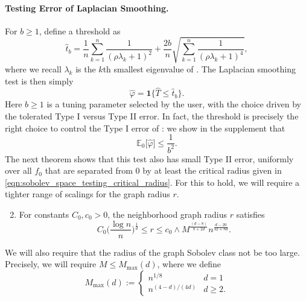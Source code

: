 \documentclass[twoside]{article}
\newcommand{\1}{\mathbf{1}}
\newcommand{\Lap}{L}
\newcommand{\Ebb}{\mathbb{E}}
\newcommand{\wh}[1]{\widehat{#1}}
\theoremstyle{definition}
\theoremstyle{remark}
\begin{document}
\paragraph{Testing Error of Laplacian Smoothing.}

For $b \geq 1$, define a threshold \smash{$\wh{t}_b$} as
\begin{equation*}
\wh{t}_{b} = \frac{1}{n}\sum_{k = 1}^{n} \frac{1}{(\rho \lambda_k + 1)^2} + \frac{2b}{n}\sqrt{\sum_{k = 1}^{n} \frac{1}{(\rho \lambda_k + 1)^4}},
\end{equation*}
where we recall $\lambda_k$ is the $k$th smallest eigenvalue of \smash{$\Lap_{n,r}$}. The Laplacian smoothing test is then simply
\begin{equation*}
\wh{\varphi} = \1\bigl\{\wh{T} \leq \wh{t}_b\bigr\}.
\end{equation*} 
Here $b \geq 1$ is a tuning parameter selected by the user, with the choice driven by the tolerated Type I versus Type II error. In fact, the threshold \smash{$\wh{t}_b$} is precisely the right choice to control the Type I error of \smash{$\wh{\varphi}$}: we show in the supplement that
\begin{equation}
\label{eqn:type_I_error}
\Ebb_0\bigl[\wh{\varphi}\bigr] \leq \frac{1}{b^2}.
\end{equation}
The next theorem shows that this test also has small Type II error, uniformly over all $f_0$ that are separated from $0$ by at least the critical radius given in \eqref{eqn:sobolev_space_testing_critical_radius}. For this to hold, we will require a tighter range of scalings for the graph radius $r$.
\begin{enumerate}[label=(R\arabic*)]
	\setcounter{enumi}{1}
	\item 
	\label{asmp:ls_kernel_radius_testing}
	For constants $C_0,c_0>0$, the neighborhood graph radius $r$ satisfies
	\begin{equation*}
	C_0\biggl(\frac{\log n}{n}\biggr)^{\frac{1}{d}} \leq r \leq c_0 \wedge M^{\frac{(d - 8)}{8 + 2d}} n^{\frac{d - 20}{32 + 8d}}.
	\end{equation*}
\end{enumerate}
We will also require that the radius of the graph Sobolev class not be too large. Precisely, we will require $M \leq M_{\max}(d)$, where we define
\begin{equation*}
M_{\max}(d) :=
\begin{cases*}
n^{1/8} & \textrm{$d = 1$} \\
n^{(4 - d)/(4d)} & \textrm{$d \geq 2$}.
\end{cases*}
\end{equation*}
\end{document}
